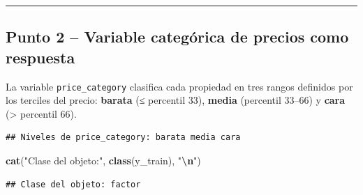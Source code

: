\documentclass[
]{article}
\newenvironment{Shaded}{\begin{snugshade}}{\end{snugshade}}
\newcommand{\FunctionTok}[1]{\textcolor[rgb]{0.13,0.29,0.53}{\textbf{#1}}}
\newcommand{\NormalTok}[1]{#1}
\newcommand{\OtherTok}[1]{\textcolor[rgb]{0.56,0.35,0.01}{#1}}
\newcommand{\SpecialCharTok}[1]{\textcolor[rgb]{0.81,0.36,0.00}{\textbf{#1}}}
\newcommand{\StringTok}[1]{\textcolor[rgb]{0.31,0.60,0.02}{#1}}
\begin{document}
\begin{center}\rule{0.5\linewidth}{0.5pt}\end{center}

\hypertarget{punto-2-variable-categuxf3rica-de-precios-como-respuesta}{%
\subsection{Punto 2 -- Variable categórica de precios como
respuesta}\label{punto-2-variable-categuxf3rica-de-precios-como-respuesta}}

La variable \texttt{price\_category} clasifica cada propiedad en tres
rangos definidos por los terciles del precio: \textbf{barata} (≤
percentil 33), \textbf{media} (percentil 33--66) y \textbf{cara}
(\textgreater{} percentil 66).

\begin{Shaded}
\end{Shaded}

\begin{verbatim}
## Niveles de price_category: barata media cara
\end{verbatim}

\begin{Shaded}
\begin{Highlighting}[]
\FunctionTok{cat}\NormalTok{(}\StringTok{"Clase del objeto:"}\NormalTok{, }\FunctionTok{class}\NormalTok{(y\_train), }\StringTok{"}\SpecialCharTok{\textbackslash{}n}\StringTok{"}\NormalTok{)}
\end{Highlighting}
\end{Shaded}

\begin{verbatim}
## Clase del objeto: factor
\end{verbatim}
\end{document}
